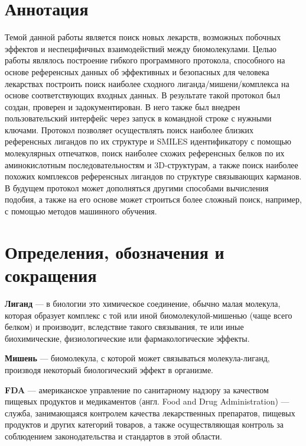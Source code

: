 \documentclass[a4paper,14pt]{article}         %
\begin{document}
\section*{Аннотация}

	\Large
Темой данной работы является поиск новых лекарств, возможных побочных эффектов и неспецифичных взаимодействий между биомолекулами. Целью работы являлось построение гибкого программного протокола, способного на основе референсных данных об эффективных и безопасных для человека лекарствах построить поиск наиболее сходного лиганда/мишени/комплекса на основе соответствующих входных данных. В результате такой протокол был создан, проверен и задокументирован. \color{orange}В него также был внедрен пользовательский интерфейс через запуск в командной строке с нужными ключами\color{black}. Протокол позволяет осуществлять поиск наиболее близких референсных лигандов по их структуре и SMILES идентификатору с помощью молекулярных отпечатков, поиск наиболее схожих референсных белков по их аминокислотным последовательностям и 3D-структурам, а также поиск наиболее похожих комплексов референсных лигандов по структуре связывающих карманов. В будущем протокол может дополняться другими способами вычисления подобия, а также на его основе может строиться более сложный поиск, например, с помощью методов машинного обучения.

\setcounter{page}{2}            %

\newpage                        %
\tableofcontents                %

\newpage
\section*{Определения, обозначения и сокращения}

\textbf{Лиганд} --- в биологии это химическое соединение, обычно малая молекула, которая образует комплекс с той или иной биомолекулой-мишенью (чаще всего белком) и производит, вследствие такого связывания, те или иные биохимические, физиологические или фармакологические эффекты.

\textbf{Мишень} --- биомолекула, с которой может связываться молекула-лиганд, производя некоторый биологический эффект в организме.

\textbf{FDA} --- американское управление по санитарному надзору за качеством пищевых продуктов и медикаментов (англ. Food and Drug \linebreak Administration) --- служба, занимающаяся контролем качества лекарственных препаратов, пищевых продуктов и других категорий товаров, а также осуществляющая контроль за соблюдением законодательства и стандартов в этой области. 
\end{document}
